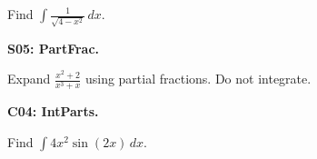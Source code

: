 \documentclass[12pt]{article}
\newcommand{\<}{\left\langle}
\renewcommand{\>}{\right\rangle}
\newcommand{\exerciseHeader}[4]{


  \vspace{0.5em}
  \textbf{#2}
  \vspace{0.5em}

}
\begin{document}
\begin{multicols}{2}
Find \(\int\frac{1}{\sqrt{4-x^2}}\,dx\).


%

%

%

\exerciseHeader{2017 June 15}{S05: PartFrac.}{
Use partial fractions to integrate rational functions.
}{2/3}

Expand \(\displaystyle\frac{x^2+2}{x^3+x}\) using partial fractions.
Do not integrate.



%

%

%

%

%

%

\exerciseHeader{2017 July 06}{C04: IntParts.}{
Use integration by parts.
}{Extra2}

Find \(\int 4x^2\sin(2x)\,dx\).




\end{multicols}
\end{document}
